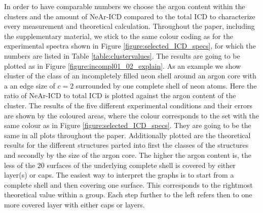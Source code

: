 In order to have comparable numbers we choose the argon content within
the clusters and the amount of NeAr-ICD compared to the total ICD to
characterize every measurement and theoretical calculation.
Throughout the paper, including the supplementary material, we stick to the same 
colour coding as for the experimental spectra shown in Figure \ref{figure:selected_ICD_specs},
for which the numbers are listed in Table \ref{table:clustervalues}.
The results are going to be plotted as in Figure \ref{figure:incompl01_02_explain}.
As an example we show cluster of the class of an incompletely filled neon shell
around an argon core with a an edge size of $c=2$
surrounded by one complete shell of neon atoms.
Here the ratio of NeAr-ICD to total ICD is plotted against the argon content
of the cluster. The results of the five different experimental conditions and their
errors are shown by the coloured areas, where the colour corresponds to the
set with the same colour as in Figure \ref{figure:selected_ICD_specs}.
They are going to be the same in all plots throughout the paper.
Additionally plotted are the theoretical results for the different structures
parted into first the classes of the structures and secondly by the size of the argon core.
The higher the argon content is, the less of the 20 surfaces of the underlying
complete shell is covered by either layer(s) or caps. The easiest way to interpret
the graphs is to start from a complete shell and then covering one surface. This
corresponds to the rightmost theoretical value within a group. Each step further
to the left refers then to one more covered layer with either caps or layers.\\

